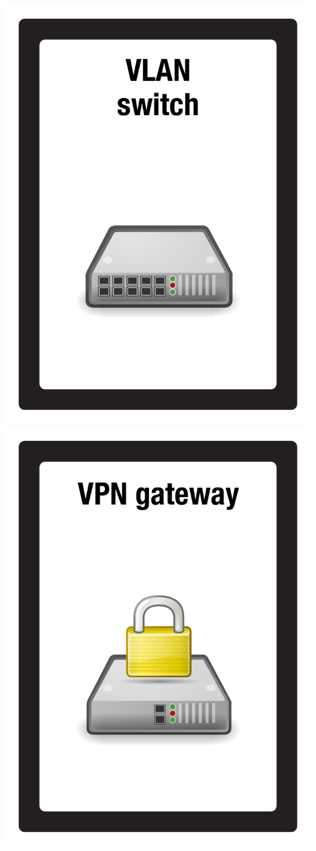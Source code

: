 \documentclass{letter}
\begin{document}
\includegraphics{patch/patch_vlan_switch}
\includegraphics{patch/patch_vpn_gateway}
\end{document}

